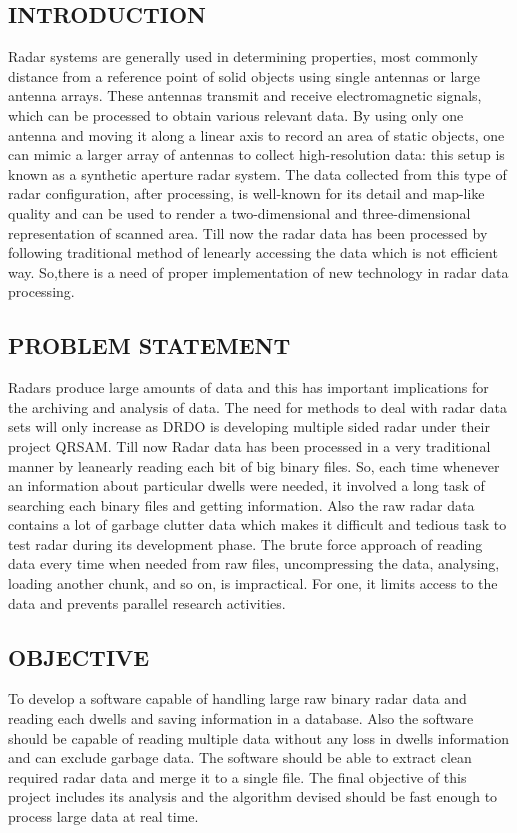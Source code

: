 \documentclass[12pt]{article} %
\begin{document}
\subsection{INTRODUCTION}
         Radar systems are generally used in determining properties, most commonly distance from a reference point of solid objects using single antennas or large antenna arrays. These antennas transmit and receive electromagnetic signals, which can be processed to obtain various relevant data. By using only one antenna and moving it along a linear axis to record an area of static objects, one can mimic a larger array of antennas to collect high-resolution data: this setup is known as a synthetic aperture radar system. The data collected from this type of radar configuration, after processing, is well-known for its detail and map-like quality and can be used to render a two-dimensional and three-dimensional representation of scanned area.
         Till now the radar data has been processed by following traditional method of lenearly accessing the data which is not efficient way. So,there is a need of proper implementation of new technology in radar data processing.

\subsection{PROBLEM STATEMENT}
           Radars produce large amounts of data and this has important implications for the archiving and analysis of data. The need for methods to deal with radar data sets will only increase as DRDO is developing multiple sided radar under their project QRSAM. Till now Radar data has been processed in a very traditional manner by leanearly reading each bit of big binary files. So, each time whenever an information about particular dwells were needed, it involved a long task of searching each binary files and getting information. Also the raw radar data contains a lot of garbage clutter data which makes it difficult and tedious task to test radar during its development phase. The brute force approach of reading data every time when needed from raw files, uncompressing the data, analysing, loading another chunk, and so on, is impractical. For one, it limits access to the data and prevents parallel research activities.

\subsection{OBJECTIVE}
 To develop a software capable of handling large raw binary radar data and reading each dwells and saving information in a database. Also the software should be capable of reading multiple data without any loss in dwells information and can exclude garbage data. The software should be able to extract clean required radar data and merge it to a single file. The final objective of this project includes its analysis and the algorithm devised should be fast enough to process large data at real time. 
\end{document}
